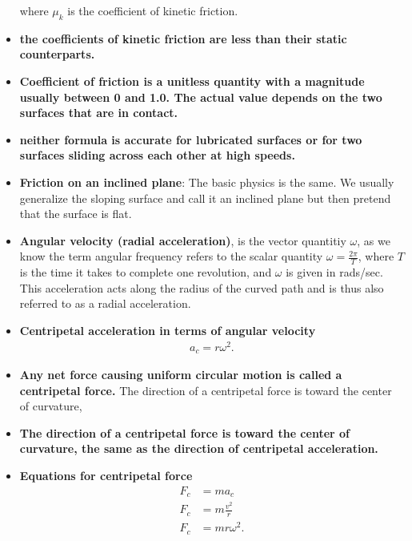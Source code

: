 \documentclass{report}
\begin{document}
\begin{itemize}
\begin{equation}
                    \end{equation}
                    where $\mu_k$ is the coefficient of kinetic friction.
                \item \textbf{the coefficients of kinetic friction are less than their static counterparts.}
                \item \textbf{Coefficient of friction is a unitless quantity with a magnitude usually between 0 and 1.0. The actual value depends on the two surfaces that are in contact.}
                \item \textbf{neither formula is accurate for lubricated surfaces or for two surfaces sliding across each other at high speeds.}
                \item \textbf{Friction on an inclined plane}:  The basic physics is the same. We usually generalize the sloping surface and call it an inclined plane but then pretend that the surface is flat.
                \item \textbf{Angular velocity (radial acceleration)}, is the vector quantitiy $\omega$, as we know the term angular frequency refers to the scalar quantity $\omega = \frac{2\pi}{T}$, where $T$ is the time it takes to complete one revolution, and $\omega$ is given in rads/sec. This acceleration acts along the radius of the curved path and is thus also referred to as a radial acceleration.
                \item \textbf{Centripetal acceleration in terms of angular velocity}
                    \begin{align*}
                        a_{c} = r\omega^{2}
                    .\end{align*}
                \item \textbf{Any net force causing uniform circular motion is called a centripetal force.} The direction of a centripetal force is toward the center of curvature,
                \item \textbf{The direction of a centripetal force is toward the center of curvature, the same as the direction of centripetal acceleration.}
                \item \textbf{Equations for centripetal force}
                    \begin{align*}
                        F_{c} &= ma_{c} \\
                        F_{c} &= m \frac{v^{2}}{r}  \\
                              F_{c}&=mr\omega^{2}
                    .\end{align*}

\end{itemize}
\end{document}
